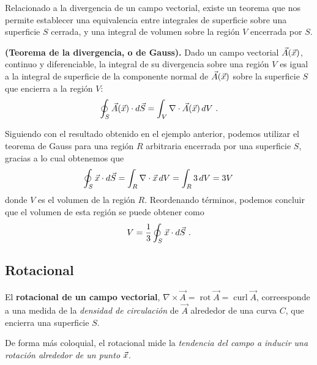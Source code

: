 
Relacionado a la divergencia de un campo vectorial, existe un teorema que nos permite establecer una equivalencia entre integrales de superficie sobre una superficie $S$ cerrada, y una integral de volumen sobre la región $V$ encerrada por $S$.

\begin{teorema}{\textbf{(Teorema de la divergencia, o de Gauss).}} 
    Dado un campo vectorial $\vec{A}(\vec{x})$, continuo y diferenciable, la integral de su divergencia sobre una región $V$ es igual a la integral de superficie de la componente normal de $\vec{A}(\vec{x})$ sobre la superficie $S$ que encierra a la región $V$:
    \begin{equation}
        \oint_S \vec{A}(\vec{x}) \cdot d\vec{S} = \int_V \nabla \cdot \vec{A}(\vec{x}) \, dV \ .
    \end{equation}
\end{teorema}

\begin{ejemplo}
    Siguiendo con el resultado obtenido en el ejemplo anterior, podemos utilizar el teorema de Gauss para una región $R$ arbitraria encerrada por una superficie $S$, gracias a lo cual obtenemos que 
    \begin{equation*}
        \oint_S \vec{x} \cdot d\vec{S} = \int_R \nabla \cdot \vec{x} \, dV = \int_R 3 \, dV = 3V \,
    \end{equation*}
    donde $V$ es el volumen de la región $R$. Reordenando términos, podemos concluir que el volumen de esta región se puede obtener como 
    \begin{equation}
        V = \frac{1}{3} \oint_S \vec{x} \cdot d\vec{S} \ .
    \end{equation}
\end{ejemplo}

\subsection{Rotacional}

\begin{defi}
    El \textbf{rotacional de un campo vectorial}, $\nabla \times \vec{A} = \operatorname{rot} \vec{A} = \operatorname{curl} \vec{A}$, correesponde a una medida de la \emph{densidad de circulación} de $\vec{A}$ alrededor de una curva $C$, que encierra una superficie $S$.

    De forma más coloquial, el rotacional mide la \emph{tendencia del campo a inducir una rotación alrededor de un punto} $\vec{x}$.
\end{defi}


